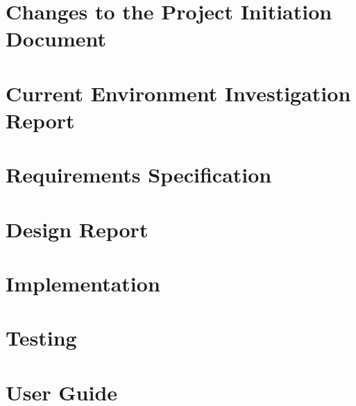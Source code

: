 \documentclass[preprint,12pt,review,authoryear]{elsarticle}
\begin{document}
\section{Changes to the Project Initiation Document}
\renewcommand{\thepage}{C\arabic{page}}
\newpage
\section{Current Environment Investigation Report}
\renewcommand{\thepage}{D\arabic{page}}
\newpage
\section{Requirements Specification}
\renewcommand{\thepage}{E\arabic{page}}
\newpage
\section{Design Report}
\renewcommand{\thepage}{F\arabic{page}}
\newpage
\section{Implementation}
\renewcommand{\thepage}{G\arabic{page}}
\newpage
\section{Testing}
\renewcommand{\thepage}{H\arabic{page}}
\newpage
\section{User Guide}
\renewcommand{\thepage}{I\arabic{page}}
\newpage
\end{document}
